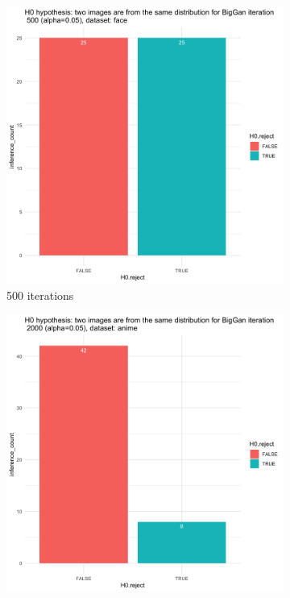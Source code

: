 \documentclass{article}
\begin{document}
\begin{figure}[h!]
    \caption{Dataset Anime}
     \centering
     \begin{subfigure}[b]{0.3\textwidth}
         \centering
         \includegraphics[width=\textwidth]{kmmd_figures/biggan_anime_500.png}
         \caption{500 iterations}
     \end{subfigure}
     \hfill
     \begin{subfigure}[b]{0.3\textwidth}
         \centering
         \includegraphics[width=\textwidth]{kmmd_figures/biggan_anime_2000.png}

\end{subfigure}
\end{figure}
\end{document}
